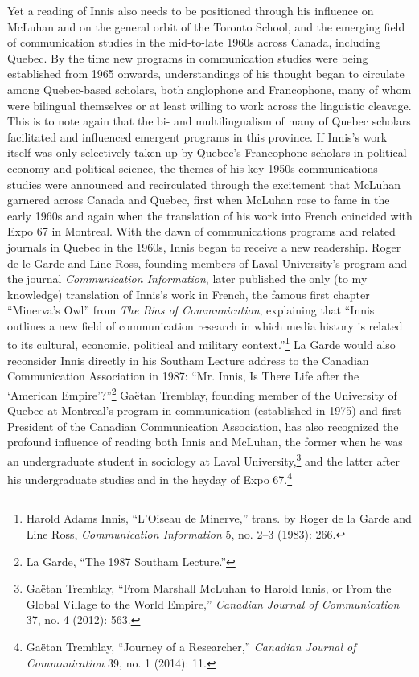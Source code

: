 \documentclass{tufte-handout}
\begin{document}
Yet a reading of Innis also needs to be positioned through his influence
on McLuhan and on the general orbit of the Toronto School, and the
emerging field of communication studies in the mid-to-late 1960s across
Canada, including Quebec. By the time new programs in communication
studies were being established from 1965 onwards, understandings of his
thought began to circulate among Quebec-based scholars, both anglophone
and Francophone, many of whom were bilingual themselves or at least
willing to work across the linguistic cleavage. This is to note again
that the bi- and multilingualism of many of Quebec scholars facilitated
and influenced emergent programs in this province. If Innis's work
itself was only selectively taken up by Quebec's Francophone scholars in
political economy and political science, the themes of his key 1950s
communications studies were announced and recirculated through the
excitement that McLuhan garnered across Canada and Quebec, first when
McLuhan rose to fame in the early 1960s and again when the translation
of his work into French coincided with Expo 67 in Montreal. With the
dawn of communications programs and related journals in Quebec in the
1960s, Innis began to receive a new readership. Roger de le Garde and
Line Ross, founding members of Laval University's program and the
journal \emph{Communication Information}, later published the only (to
my knowledge) translation of Innis's work in French, the famous first
chapter ``Minerva's Owl'' from \emph{The Bias of Communication},
explaining that ``Innis outlines a new field of communication research
in which media history is related to its cultural, economic, political
and military context.''\footnote{Harold Adams Innis, ``L'Oiseau de
  Minerve,'' trans. by Roger de la Garde and Line Ross,
  \emph{Communication Information} 5, no. 2--3 (1983): 266.} La Garde
would also reconsider Innis directly in his Southam Lecture address to
the Canadian Communication Association in 1987: ``Mr. Innis, Is There
Life after the `American Empire'?''\footnote{La Garde, ``The 1987
  Southam Lecture.''} Gaëtan Tremblay, founding member of the University
of Quebec at Montreal's program in communication (established in 1975)
and first President of the Canadian Communication Association, has also
recognized the profound influence of reading both Innis and McLuhan, the
former when he was an undergraduate student in sociology at Laval
University,\footnote{Gaëtan Tremblay, ``From Marshall McLuhan to Harold
  Innis, or From the Global Village to the World Empire,''
  \emph{Canadian Journal of Communication} 37, no. 4 (2012): 563.} and
the latter after his undergraduate studies and in the heyday of Expo
67.\footnote{Gaëtan Tremblay, ``Journey of a Researcher,''
  \emph{Canadian Journal of Communication} 39, no. 1 (2014): 11.}
\end{document}
